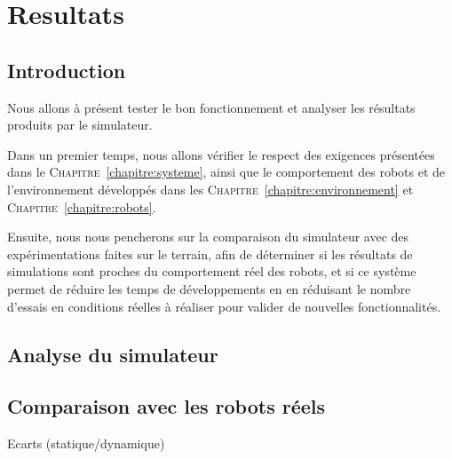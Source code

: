 \chapter{Resultats}
	
	\section{Introduction}

		Nous allons à présent tester le bon fonctionnement et analyser les résultats produits par le simulateur.
		
		Dans un premier temps, nous allons vérifier le respect des exigences présentées dans le \textsc{Chapitre}~\ref{chapitre:systeme}, ainsi que le comportement des robots et de l'environnement développés dans les \textsc{Chapitre}~\ref{chapitre:environnement} et \textsc{Chapitre}~\ref{chapitre:robots}.

		Ensuite, nous nous pencherons sur la comparaison du simulateur avec des expérimentations faites sur le terrain, afin de déterminer si les résultats de simulations sont proches du comportement réel des robots, et si ce système permet de réduire les temps de développements en en réduisant le nombre d'essais en conditions réelles à réaliser pour valider de nouvelles fonctionnalités.

	\section{Analyse du simulateur}

	\section{Comparaison avec les robots réels}

		Ecarts (statique/dynamique)
